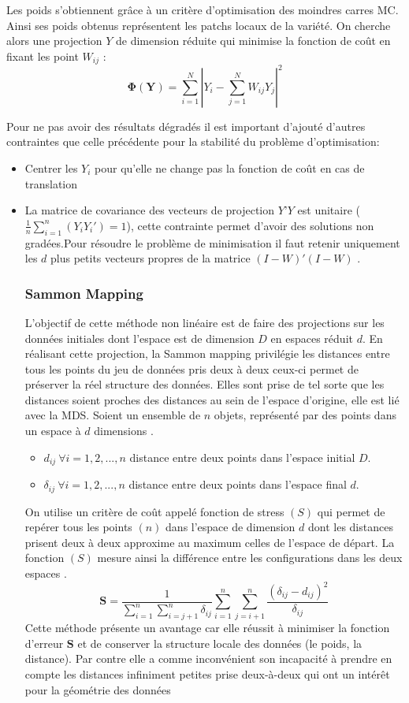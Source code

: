 \documentclass[twoside,twocolumn]{article}
\begin{document}
Les poids s’obtiennent grâce à un critère d’optimisation  des moindres carres MC. Ainsi ses poids obtenus représentent les patchs locaux de la variété. On cherche alors une projection $Y$ de dimension réduite qui minimise la fonction de coût en fixant les point  $W_{ij}$ \cite{Khoder13}:
\[ \mathbf {\Phi(Y)}= \sum_{i=1}^{N}| Y_i - \sum_{j=1}^{N} W_{ij}Y_j|^2\]

Pour ne pas avoir des résultats dégradés il est important d’ajouté d’autres contraintes que celle précédente pour la stabilité du problème d’optimisation:

\begin{itemize}
\item Centrer les $Y_i$ pour qu’elle ne change pas la fonction de coût en cas de translation
\item La matrice de covariance des vecteurs de projection $Y’Y$ est unitaire ( $\frac{1}{n}\sum_{i=1}^{n} (Y_iY_i')=1$), cette contrainte permet d’avoir des solutions non gradées.Pour résoudre le problème de minimisation il faut retenir uniquement les $d$ plus petits vecteurs propres de la matrice $(I-W)'(I-W)$ \cite{Khoder13}.



\subsubsection{Sammon Mapping}
L’objectif de cette méthode non linéaire est de faire des projections sur les données initiales dont l’espace est de dimension $D$ en espaces réduit $d$. En réalisant cette projection, la Sammon mapping privilégie les distances entre tous les points du jeu de données pris deux à deux ceux-ci permet de préserver la réel structure des données. Elles sont prise de tel sorte que les distances soient proches des distances au sein de l'espace d'origine, elle est lié avec la MDS.
Soient un ensemble de $n$ objets, représenté par des points dans un espace à $d$ dimensions \cite{Khoder13}.
\begin{itemize}
\item $d_{ij}   \>\forall  i = 1,2, ..., n$ distance entre deux points dans l'espace initial $D$.
\item  $\delta_{ij} \> \forall i = 1, 2,..., n$ distance entre deux points dans l'espace final $d$.
\end{itemize}
 
On utilise un critère de coût appelé fonction de stress $(S)$ qui permet de repérer tous les points $(n)$ dans l’espace de dimension $d$ dont les distances prisent deux à deux approxime au maximum celles  de l'espace de départ.  
La fonction $(S)$ mesure ainsi la différence entre les configurations dans les deux espaces \cite{Khoder13}. 
\[ \mathbf {S}=  \frac{1}{\sum_{i=1}^{n} \sum_{i=j+1}^{n} \delta_{ij}} \sum_{i=1}^{n} \sum_{j=i+1}^{n}
\frac{(\delta_{ij}-d_{ij})^2}{\delta_{ij}}\]
Cette méthode présente un avantage car elle réussit à  minimiser la fonction d’erreur $\mathbf{S}$ et de conserver la structure locale des données (le poids, la distance).  Par contre elle a comme inconvénient son  incapacité à prendre en compte les distances infiniment petites prise deux-à-deux qui ont un intérêt pour la géométrie des données



\end{itemize}
\end{document}
